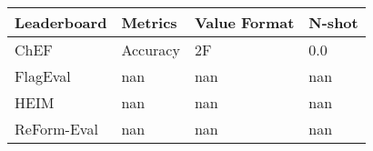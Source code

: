 \begin{tabular}{llll}
\toprule
Leaderboard & Metrics & Value Format & N-shot \\
\midrule
ChEF & Accuracy & 2F & 0.0 \\
FlagEval & nan & nan & nan \\
HEIM & nan & nan & nan \\
ReForm-Eval & nan & nan & nan \\
\bottomrule
\end{tabular}
